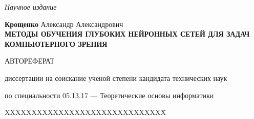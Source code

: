\documentclass{thesisby}
\begin{document}
\newpage
\thispagestyle{empty}

\vspace* {0.5cm}

\begin{center}
\textit{Научное издание}

\vspace*{\fill}

\textbf{Крощенко} Александр Александрович\\[25mm]
 {\large\bf МЕТОДЫ ОБУЧЕНИЯ ГЛУБОКИХ НЕЙРОННЫХ СЕТЕЙ ДЛЯ ЗАДАЧ КОМПЬЮТЕРНОГО ЗРЕНИЯ \\}
 
\vspace* {2cm}

 
АВТОРЕФЕРАТ
 
диссертации на соискание ученой степени кандидата технических наук

\vspace* {1cm}

по специальности 05.13.17 — Теоретические основы информатики

\end{center}

\vspace*{\fill}\vspace*{\fill} \vspace*{\fill} \vspace*{\fill}
\begin{tabbing}
XXXXXXXXXXXXXXXXXXXXXXXXXXXXXX\= \kill
\end{tabbing}

\begin{center}



\end{center}
\end{document}
